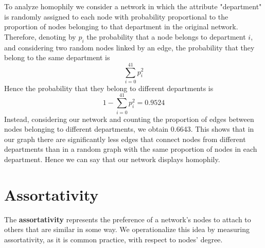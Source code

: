 \documentclass{report}
\theoremstyle{definition}
\theoremstyle{remark}
\begin{document}
To analyze homophily we consider a network in which the attribute "department" is randomly assigned to each node with probability proportional to the proportion of nodes belonging to that department in the original network. Therefore, denoting by $p_i$ the probability that a node belongs to department $i$, and considering two random nodes linked by an edge, the probability that they belong to the same department is
\begin{equation*}
\sum_{i=0}^{41} p_i^2
\end{equation*}
Hence the probability that they belong to different departments is
\begin{equation*}
1-\sum_{i=0}^{41} p_i^2 = 0.9524
\end{equation*}
Instead, considering our network and counting the proportion of edges between nodes belonging to different departments, we obtain 0.6643. This shows that in our graph there are significantly less edges that connect nodes from different departments than in a random graph with the same proportion of nodes in each department. Hence we can say that our network displays homophily.
\section*{Assortativity}
The \textbf{assortativity} represents the preference of a network's nodes to attach  to others that are similar in some way. We operationalize this idea by measuring assortativity, as it is common practice, with respect to nodes' degree.
\end{document}
